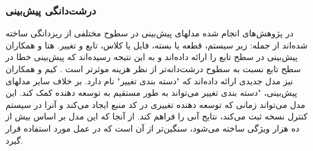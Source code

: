 \subsubsection{درشت‌دانگی پیش‌بینی }
در پژوهش‌های انجام شده مدلهای پیش‌بینی در سطوح مختلفی از ریزدانگی ساخته شده‌اند از جمله: زیر سیستم، قطعه یا بسته، فایل یا کلاس، تابع و تغییر. هتا و همکاران  پیش‌بینی در سطح تابع را ارائه داده‌اند و به این نتیجه رسیده‌اند که پیش‌بینی خطا در سطح تابع نسبت به سطوح درشت‌دانه‌تر از نظر هزینه موثرتر است \cite{hata2012bug}. کیم و همکاران نیز مدل جدیدی ارائه داده‌اند که "دسته بندی تغییر" نام دارد. بر خلاف سایر مدلهای پیش‌بینی، "دسته بندی تغییر می‌تواند به طور مستقیم به توسعه دهنده کمک کند. این مدل می‌تواند زمانی که توسعه دهنده تغییری در کد منبع ایجاد می‌کند و آنرا در سیستم کنترل نسخه ثبت می‌کند، نتایج آنی را فراهم کند.  از آنجا که این مدل بر اساس بیش از ده هزار ویژگی ساخته می‌شود، سنگین‌تر از آن است که در عمل مورد استفاده قرار گیرد\cite{kim2008classifying}. \\


